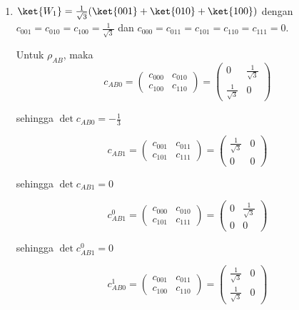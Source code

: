 \begin{enumerate}
	sehingga $\det c_{0BC}^1 = 0$.
	
	Maka
	\begin{equation}
		\mathrm{Tr}\,\rho_{BC}\tilde{\rho}_{BC}=\frac{\sin^2 2\theta}{2}
	\end{equation}
	
	\item { $\ket{W_1}=\frac{1}{\sqrt{3}}(\ket{001}+\ket{010}+\ket{100})$}
	dengan $c_{001}=c_{010}=c_{100}=\frac{1}{\sqrt{3}}$ dan $c_{000}=c_{011}=c_{101}=c_{110}=c_{111}=0$.
	
	Untuk $\rho_{AB}$, maka
	\begin{equation}
		c_{AB0}=
		\begin{pmatrix}
			c_{000} & c_{010} \\
			c_{100} & c_{110}
		\end{pmatrix}=
		\begin{pmatrix}
			0 & \frac{1}{\sqrt{3}} \\
			\frac{1}{\sqrt{3}} & 0
		\end{pmatrix}
	\end{equation}
	
	sehingga $\det c_{AB0} = -\frac{1}{3}$
	
	\begin{equation}
		c_{AB1}=
		\begin{pmatrix}
			c_{001} & c_{011} \\
			c_{101} & c_{111}
		\end{pmatrix}=
		\begin{pmatrix}
			\frac{1}{\sqrt{3}} & 0 \\
			0 & 0
		\end{pmatrix}
	\end{equation}
	
	sehingga $\det c_{AB1} = 0$
	
	\begin{equation}
		c_{AB1}^0=
		\begin{pmatrix}
			c_{000} & c_{010} \\
			c_{101} & c_{111}
		\end{pmatrix}=
		\begin{pmatrix}
			0 & \frac{1}{\sqrt{3}} \\
			0 & 0
		\end{pmatrix}
	\end{equation}
	
	sehingga $\det c_{AB1}^0 = 0$
	
	\begin{equation}
		c_{AB0}^1=
		\begin{pmatrix}
			c_{001} & c_{011} \\
			c_{100} & c_{110}
		\end{pmatrix}=
		\begin{pmatrix}
			\frac{1}{\sqrt{3}} & 0 \\
			\frac{1}{\sqrt{3}} & 0
		\end{pmatrix}
	\end{equation}
	

\end{enumerate}
